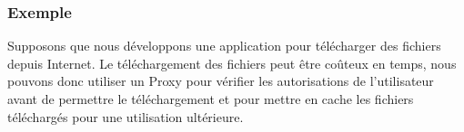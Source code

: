 \subsubsection{Exemple}

Supposons que nous développons une application pour télécharger des fichiers depuis Internet. Le téléchargement des fichiers peut être coûteux en temps, nous pouvons donc utiliser un Proxy pour vérifier les autorisations de l'utilisateur avant de permettre le téléchargement et pour mettre en cache les fichiers téléchargés pour une utilisation ultérieure.




\newpage

